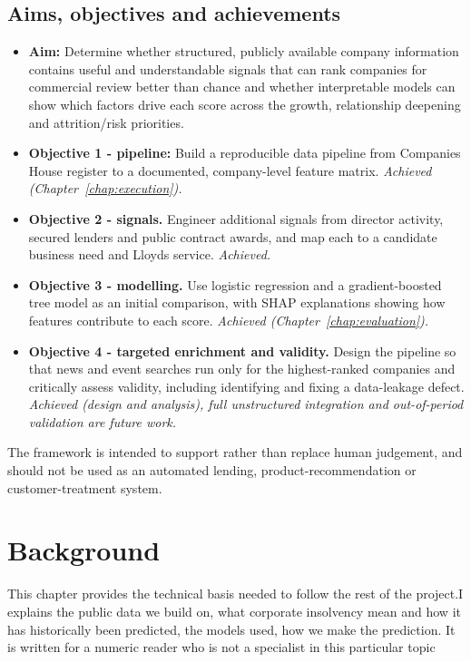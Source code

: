 \documentclass[ %
                    author={Daniel Page},
                supervisor={Dr. Andrew Calway},
                    degree={MSc},
                     title={Some Structural Guidelines for Data Science MSc Theses, Including Those With Long Titles that Run Across Multiple Lines on the Front Page},
                  subtitle={And those including an optional subtitle too, for good measure},
                      type={},
                      year={2021}]{dissertation}
\begin{document}
\section{Aims, objectives and achievements}
\begin{itemize}
\item \textbf{Aim:} Determine whether structured, publicly available company information contains useful and understandable signals that can rank companies for commercial review better than chance and whether interpretable models can show which factors drive each score across the growth, relationship deepening and attrition/risk priorities.
\item \textbf{Objective 1 - pipeline:} Build a reproducible data pipeline from Companies House register to a documented, company-level feature matrix. \emph{Achieved (Chapter~\ref{chap:execution}).}
\item \textbf{Objective 2 - signals.} Engineer additional signals from director activity, secured lenders and public contract awards, and map each to a candidate business need and Lloyds service. \emph{Achieved.}
\item \textbf{Objective 3 - modelling.} Use logistic regression and a gradient-boosted tree model as an initial comparison, with SHAP explanations showing how features contribute to each score.
\emph{Achieved (Chapter~\ref{chap:evaluation}).}
\item \textbf{Objective 4 - targeted enrichment and validity.} Design the pipeline so that news and event searches run only for the highest-ranked companies and critically assess validity, including identifying and fixing a data-leakage defect. \emph{Achieved (design and analysis), full unstructured integration and out-of-period validation are future work.}
\end{itemize}

\noindent
The framework is intended to support rather than replace human judgement, and should
not be used as an automated lending, product-recommendation or customer-treatment
system.

 

\chapter{Background}
\label{chap:background}

\noindent
This  chapter provides the technical basis needed to follow the rest of the project.I explains the public data we build on, what corporate insolvency mean and how it has historically been predicted, the models used, how we make the prediction. It is written for a numeric reader who is not a specialist in this particular topic
\end{document}
